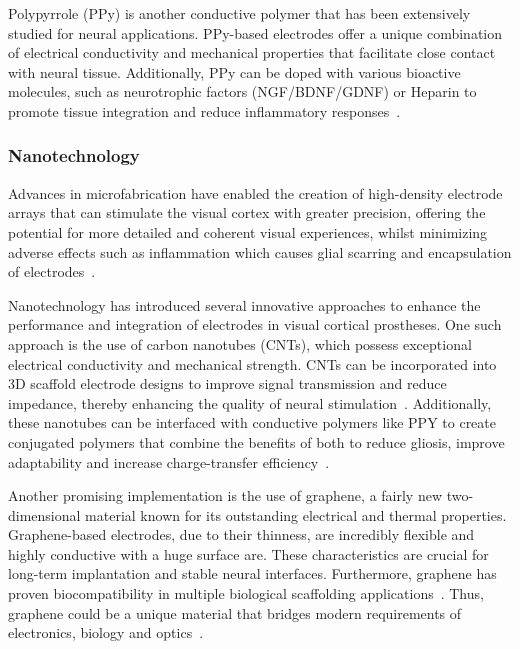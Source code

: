 \documentclass[twocolumn,10pt]{article}
\begin{document}
Polypyrrole (PPy) is another conductive polymer that has been extensively
studied for neural applications. PPy-based electrodes offer a unique combination
of electrical conductivity and mechanical properties that facilitate close
contact with neural tissue. Additionally, PPy can be doped with various
bioactive molecules, such as neurotrophic factors (NGF/BDNF/GDNF) or Heparin to
promote tissue integration and reduce inflammatory
responses~\parencite{zareElectroconductiveMultifunctionalPolypyrrole2021a}.

\subsubsection*{Nanotechnology}
Advances in microfabrication have enabled the creation of high-density electrode
arrays that can stimulate the visual cortex with greater precision, offering the
potential for more detailed and coherent visual
experiences, whilst minimizing adverse effects such as inflammation which causes
glial scarring and encapsulation of electrodes~\parencite{ryuSpatiallyConfinedResponses2020}.

Nanotechnology has introduced several innovative approaches to enhance the
performance and integration of electrodes in visual cortical prostheses. One
such approach is the use of carbon nanotubes (CNTs), which possess exceptional
electrical conductivity and mechanical strength. CNTs can be incorporated into
3D scaffold electrode designs to improve signal transmission and reduce
impedance, thereby enhancing the quality of neural
stimulation~\parencite{alegretThreeDimensionalConductiveScaffolds2018}.
Additionally, these nanotubes can be interfaced with conductive polymers like
PPY to create conjugated polymers that combine the benefits of both to reduce
gliosis, improve adaptability and increase charge-transfer
efficiency~\parencite{sharCarbonNanotubeNanocomposite2023}.

Another promising implementation is the use of graphene, a fairly new
two-dimensional material known for its outstanding electrical and thermal
properties. Graphene-based electrodes, due to their thinness, are incredibly
flexible and highly conductive with a huge surface are. These characteristics
are crucial for long-term implantation and stable neural interfaces.
Furthermore, graphene has proven biocompatibility in multiple biological
scaffolding
applications~\parencite{liThreedimensionalGrapheneFoam2013,sahniBiocompatibilityPristineGraphene2013}.
Thus, graphene could be a unique material that bridges modern requirements of
electronics, biology and
optics~\parencite{luGraphenebasedNeurotechnologiesAdvanced2018}.
\end{document}
